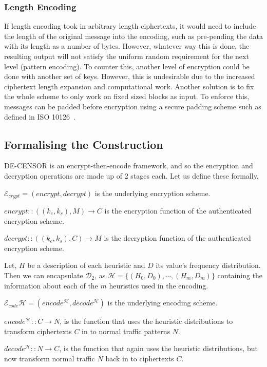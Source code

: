 \documentclass[ %
                    author={Samuel Russell},
                supervisor={Prof. Bogdan Warinschi},
                    degree={MEng},
                     title={Innocuous Ciphertexts},
                  subtitle={The DE-CENSOR Scheme},
                      type={Research},
                      year={2018} ]{dissertation}
\begin{document}
\subsubsection{Length Encoding}

If length encoding took in arbitrary length ciphertexts, it would need to include the length of the original message into the encoding, such as pre-pending the data with its length as a number of bytes.
However, whatever way this is done, the resulting output will not satisfy the uniform random requirement for the next level (pattern encoding).
To counter this, another level of encryption could be done with another set of keys. However, this is undesirable due to the increased ciphertext length expansion and computational work.
Another solution is to fix the whole scheme to only work on fixed sized blocks as input. To enforce this, messages can be padded before encryption using a secure padding scheme such as defined in ISO 10126~\cite{iso-pad}.


\subsection{Formalising the Construction}

DE-CENSOR is an encrypt-then-encode framework, and so the encryption and decryption operations are made up of 2 stages each. Let us define these formally.

$\mathcal{E}_{crypt} = (encrypt, decrypt) $ is the underlying encryption scheme.

$encrypt :: ( (k_e, k_s), M ) \rightarrow C$ is the encryption function of the authenticated encryption scheme.

$decrypt :: ( (k_e, k_s), C ) \rightarrow M$ is the decryption function of the authenticated encryption scheme.

Let, $H$ be a description of each heuristic and $D$ its value's frequency distribution.
Then we can encapsulate $\mathcal{D}_2$, as $\mathcal{H} = \{(H_0,D_0), \cdots , (H_m,D_m)\}$ containing the information about each of the $m$ heuristics used in the encoding.

$\mathcal{E}_{code}{\mathcal{H}} = (encode^{\mathcal{H}}, decode^{\mathcal{H}}) $ is the underlying encoding scheme.

$encode^{\mathcal{H}} :: C \rightarrow N$, is the function that uses the heuristic distributions to transform ciphertexts $C$ in to normal traffic patterns $N$.

$decode^{\mathcal{H}} :: N \rightarrow C$, is the function that again uses the heuristic distributions, but now transform normal traffic $N$ back in to ciphertexts $C$.
\end{document}
